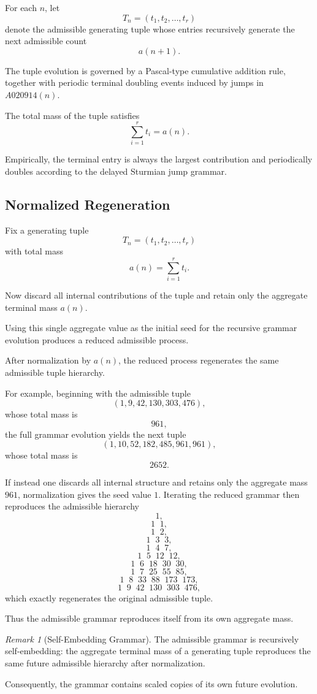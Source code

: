 \documentclass[12pt, oneside]{article}
\numberwithin{equation}{section}
\theoremstyle{definition}
\theoremstyle{plain}
\theoremstyle{remark}
\newtheorem*{remark}{Remark}
\begin{document}
For each $n$, let
\[
T_n=(t_1,t_2,\dots,t_r)
\]
denote the admissible generating tuple whose entries recursively generate
the next admissible count
\[
a(n+1).
\]

The tuple evolution is governed by a Pascal-type cumulative addition rule,
together with periodic terminal doubling events induced by jumps in
$A020914(n)$.

The total mass of the tuple satisfies
\[
\sum_{i=1}^{r} t_i = a(n).
\]

Empirically, the terminal entry is always the largest contribution and
periodically doubles according to the delayed Sturmian jump grammar.

\subsection{Normalized Regeneration}

Fix a generating tuple
\[
T_n=(t_1,t_2,\dots,t_r)
\]
with total mass
\[
a(n)=\sum_{i=1}^{r} t_i.
\]

Now discard all internal contributions of the tuple and retain only the
aggregate terminal mass $a(n)$.

Using this single aggregate value as the initial seed for the recursive
grammar evolution produces a reduced admissible process.

After normalization by $a(n)$, the reduced process regenerates the same
admissible tuple hierarchy.

For example, beginning with the admissible tuple
\[
(1,9,42,130,303,476),
\]
whose total mass is
\[
961,
\]
the full grammar evolution yields the next tuple
\[
(1,10,52,182,485,961,961),
\]
whose total mass is
\[
2652.
\]

If instead one discards all internal structure and retains only the
aggregate mass $961$, normalization gives the seed value $1$.
Iterating the reduced grammar then reproduces the admissible hierarchy
\[
1,
\]
\[
1\;\;1,
\]
\[
1\;\;2,
\]
\[
1\;\;3\;\;3,
\]
\[
1\;\;4\;\;7,
\]
\[
1\;\;5\;\;12\;\;12,
\]
\[
1\;\;6\;\;18\;\;30\;\;30,
\]
\[
1\;\;7\;\;25\;\;55\;\;85,
\]
\[
1\;\;8\;\;33\;\;88\;\;173\;\;173,
\]
\[
1\;\;9\;\;42\;\;130\;\;303\;\;476,
\]
which exactly regenerates the original admissible tuple.

Thus the admissible grammar reproduces itself from its own aggregate mass.

\begin{remark}[Self-Embedding Grammar]
The admissible grammar is recursively self-embedding:
the aggregate terminal mass of a generating tuple reproduces the same
future admissible hierarchy after normalization.

Consequently, the grammar contains scaled copies of its own future evolution.
\end{remark}
\end{document}
